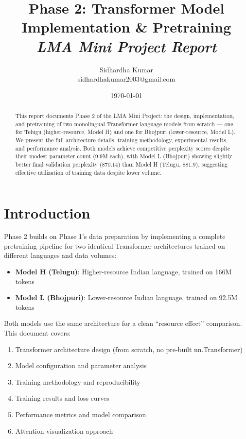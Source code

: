 \documentclass[11pt,a4paper]{article}
\title{\textbf{Phase 2: Transformer Model Implementation \& Pretraining} \\ \textit{LMA Mini Project Report}}
\author{Sidhardha Kumar \\ sidhardhakumar2003@gmail.com}
\date{\today}
\begin{document}
\maketitle

\begin{abstract}
This report documents Phase 2 of the LMA Mini Project: the design, implementation, and pretraining of two monolingual Transformer language models from scratch --- one for Telugu (higher-resource, Model H) and one for Bhojpuri (lower-resource, Model L). We present the full architecture details, training methodology, experimental results, and performance analysis. Both models achieve competitive perplexity scores despite their modest parameter count (9.9M each), with Model L (Bhojpuri) showing slightly better final validation perplexity (870.14) than Model H (Telugu, 881.9), suggesting effective utilization of training data despite lower volume.
\end{abstract}

\section{Introduction}

Phase 2 builds on Phase 1's data preparation by implementing a complete pretraining pipeline for two identical Transformer architectures trained on different languages and data volumes:

\begin{itemize}
    \item \textbf{Model H (Telugu)}: Higher-resource Indian language, trained on 166M tokens
    \item \textbf{Model L (Bhojpuri)}: Lower-resource Indian language, trained on 92.5M tokens
\end{itemize}

Both models use the same architecture for a clean ``resource effect'' comparison. This document covers:
\begin{enumerate}
    \item Transformer architecture design (from scratch, no pre-built nn.Transformer)
    \item Model configuration and parameter analysis
    \item Training methodology and reproducibility
    \item Training results and loss curves
    \item Performance metrics and model comparison
    \item Attention visualization approach
\end{enumerate}
\end{document}
